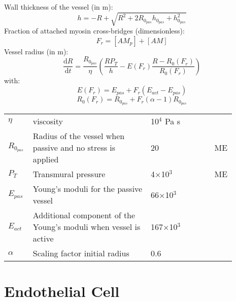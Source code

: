 \documentclass[fleqn]{report}
\numberwithin{equation}{section}
\numberwithin{equation}{section}
\newcommand{\umm}{\textmu m}
\begin{document}
	Wall thickness of the vessel (in \umm):
	\begin{equation} \label{eq:h2}
	h=-R+\sqrt{R^2+2R_{0_{pas}}h_{0_{pas}}+h_{0_{pas}}^2}
	\end{equation}
	Fraction of attached myosin cross-bridges (dimensionless):
	\begin{equation}
	F_r = [AM_p] + [AM]
	\end{equation}
	Vessel radius (in \umm):
	\begin{equation} \label{eq:dRdt2e}
	\dfrac{\mathrm{d}R}{\mathrm{d}t}= \frac{R_{0_{pas}}}{\eta}\left(   \frac{ R P_{T}}{h}  - E(F_r) \frac{R - R_0(F_r)}{R_0(F_r)} \right)
	\end{equation}
	with:
	\begin{equation}
	E(F_r)= E_{pas} + F_r \left(E_{act} - E_{pas} \right)
	\end{equation}
	\begin{equation}
	R_0(F_r)=R_{0_{pas}} + F_r (\alpha -1) R_{0_{pas}}
	\end{equation}
	\newpage
	\begin{table}[t!]
	\centering
	\begin{tabular}{ p{0.09\linewidth}  >{\footnotesize} p{0.5\linewidth}  >{\footnotesize} p{0.27\linewidth} >{\footnotesize} p{0.03\linewidth} }
	\hline
	$\eta   $				& viscosity															& 10$^4$ Pa s 		&  \cite{Koenigsberger2006}\\
	$R_{0_{pas}}$			& Radius of the vessel when passive and no stress is applied		& 20  \um 		& ME \\
	$P_T$					& Transmural pressure												& 4$\times$10$^3$ \Pa		& ME \\
	${E}_{pas}$				& Young's moduli for the passive vessel								& 66$\times$10$^3$ \Pa 		&  \cite{Gore1985}\\
	${E}_{act}$				& Additional component of the Young's moduli when vessel is active	& 167$\times$10$^3$ \Pa 	& \cite{Gore1985}\\
	$\alpha$				& Scaling factor initial radius										& 0.6    		& \cite{Gore1985}\\
	\hline
	\end{tabular}
	\label{tab:crossbridge}
	\end{table}
	
	\section{Endothelial Cell}
\end{document}
